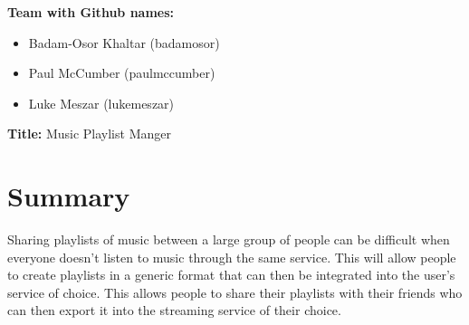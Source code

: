 \documentclass[12pt]{article}
\begin{document}
	\noindent
	\textbf{Team with Github names:}
   	 \begin{itemize}[leftmargin=0.0cm,labelsep=0.2cm]
   	 	\item[] Badam-Osor Khaltar (badamosor)
   	 	\item[] Paul McCumber (paulmccumber)
   	 	\item[] Luke Meszar (lukemeszar)
   	 \end{itemize}
    \noindent
    \textbf{Title:} Music Playlist Manger
	\section{Summary}
	Sharing playlists of music between a large group of people can be difficult when
	everyone doesn't listen to music through the same service. This will allow people to create
	playlists in a generic format that can then be integrated into the user’s service of choice. This allows people to share their playlists with their friends who can then export it into the streaming service of their choice. 
\end{document}
